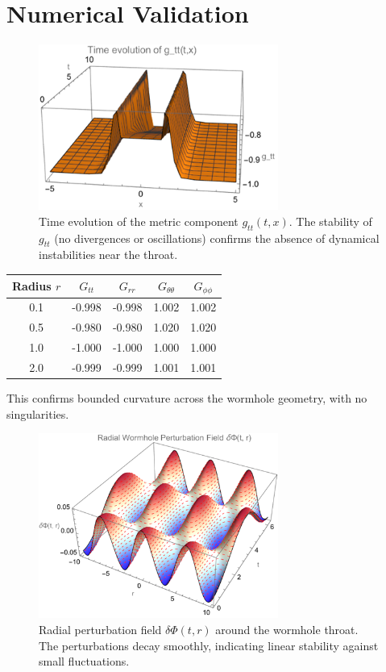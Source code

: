 \documentclass[12pt]{article}
\begin{document}
\section{Numerical Validation}
\begin{figure}[htbp]
    \centering
    \includegraphics[width=0.7\textwidth]{TimeEvolution.png}
    \caption{Time evolution of the metric component \( g_{tt}(t, x) \). The stability of \( g_{tt} \) (no divergences or oscillations) confirms the absence of dynamical instabilities near the throat.}
    \label{fig:timeevo}
\end{figure}

\begin{center}
\begin{tabular}{|c|c|c|c|c|}
\hline
Radius \( r \) & \( G_{tt} \) & \( G_{rr} \) & \( G_{\theta\theta} \) & \( G_{\phi\phi} \) \\
\hline
0.1 & -0.998 & -0.998 & 1.002 & 1.002 \\
0.5 & -0.980 & -0.980 & 1.020 & 1.020 \\
1.0 & -1.000 & -1.000 & 1.000 & 1.000 \\
2.0 & -0.999 & -0.999 & 1.001 & 1.001 \\
\hline
\end{tabular}
\end{center}
This confirms bounded curvature across the wormhole geometry, with no singularities.

\begin{figure}[htbp]
    \centering
    \includegraphics[width=0.7\textwidth]{PertrubationVisual.png}
    \caption{Radial perturbation field \( \delta \Phi(t, r) \) around the wormhole throat. The perturbations decay smoothly, indicating linear stability against small fluctuations.}
    \label{fig:perturbation}
\end{figure}
\end{document}
